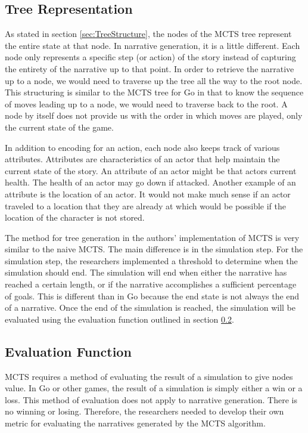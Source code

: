 \documentclass{sig-alternate}
\begin{document}
\subsection{Tree Representation}
As stated in section \ref{sec:TreeStructure}, the nodes of the MCTS tree represent the entire state at that node. In narrative generation, it is a little different. Each node only represents a specific step (or action) of the story instead of capturing the entirety of the narrative up to that point. In order to retrieve the narrative up to a node, we would need to traverse up the tree all the way to the root node. This structuring is similar to the MCTS tree for Go in that to know the sequence of moves leading up to a node, we would need to traverse back to the root. A node by itself does not provide us with the order in which moves are played, only the current state of the game.

In addition to encoding for an action, each node also keeps track of various attributes. Attributes are characteristics of an actor that help maintain the current state of the story. An attribute of an actor might be that actors current health. The health of an actor may go down if attacked. Another example of an attribute is the location of an actor. It would not make much sense if an actor traveled to a location that they are already at which would be possible if the location of the character is not stored.

The method for tree generation in the authors' implementation of MCTS is very similar to the naive MCTS. The main difference is in the simulation step. For the simulation step, the researchers implemented a threshold to determine when the simulation should end. The simulation will end when either the narrative has reached a certain length, or if the narrative accomplishes a sufficient percentage of goals. This is different than in Go because the end state is not always the end of a narrative. Once the end of the simulation is reached, the simulation will be evaluated using the evaluation function outlined in section \ref{sec:EvalFunction}.

\subsection{Evaluation Function}\label{sec:EvalFunction}
MCTS requires a method of evaluating the result of a simulation to give nodes value. In Go or other games, the result of a simulation is simply either a win or a loss. This method of evaluation does not apply to narrative generation. There is no winning or losing. Therefore, the researchers needed to develop their own metric for evaluating the narratives generated by the MCTS algorithm.
\end{document}

